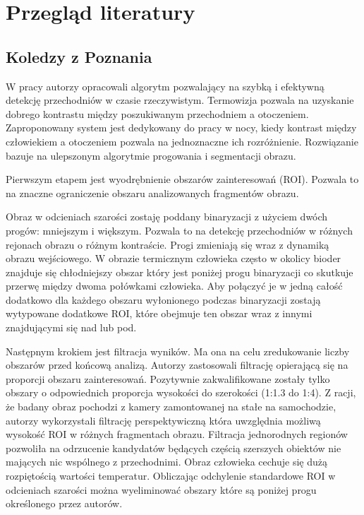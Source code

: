 \chapter{Przegląd literatury}


\section{Koledzy z Poznania}
W pracy \cite{kolzpoz} autorzy opracowali algorytm pozwalający na szybką i efektywną detekcję przechodniów w czasie rzeczywistym. 
Termowizja pozwala na uzyskanie dobrego kontrastu między poszukiwanym przechodniem a otoczeniem. 
Zaproponowany system jest dedykowany do pracy w nocy, kiedy kontrast między człowiekiem a otoczeniem pozwala na jednoznaczne ich rozróżnienie. %
Rozwiązanie bazuje na ulepszonym algorytmie progowania i segmentacji obrazu. 

Pierwszym etapem jest wyodrębnienie obszarów zainteresowań (ROI).
Pozwala to na znaczne ograniczenie obszaru analizowanych fragmentów obrazu. %

Obraz w odcieniach szarości zostaję poddany binaryzacji z użyciem dwóch progów: mniejszym i większym. Pozwala to na detekcję przechodniów w różnych rejonach obrazu o różnym kontraście. 
Progi zmieniają się wraz z dynamiką obrazu wejściowego. 
W obrazie termicznym człowieka często w okolicy bioder znajduje się chłodniejszy obszar który jest poniżej progu binaryzacji co skutkuje przerwę między dwoma połówkami człowieka. Aby połączyć je w jedną całość dodatkowo dla każdego obszaru wyłonionego podczas binaryzacji zostają wytypowane dodatkowe ROI, które obejmuje ten obszar wraz z innymi znajdującymi się nad lub pod. 

Następnym krokiem jest filtracja wyników. 
Ma ona na celu zredukowanie liczby obszarów przed końcową analizą. 
Autorzy zastosowali filtrację opierającą się na proporcji obszaru zainteresowań. 
Pozytywnie zakwalifikowane zostały tylko obszary o odpowiednich proporcja wysokości do szerokości (1:1.3 do 1:4). 
Z racji, że badany obraz pochodzi z kamery zamontowanej na stałe na samochodzie, autorzy wykorzystali filtrację perspektywiczną która uwzględnia możliwą wysokość ROI w różnych fragmentach obrazu. %
Filtracja jednorodnych regionów pozwoliła na odrzucenie kandydatów będących częścią szerszych obiektów nie mających nic wspólnego z przechodnimi. Obraz człowieka cechuje się dużą rozpiętością wartości temperatur. Obliczając odchylenie standardowe ROI w odcieniach szarości można wyeliminować obszary które są poniżej progu określonego przez autorów.  %

